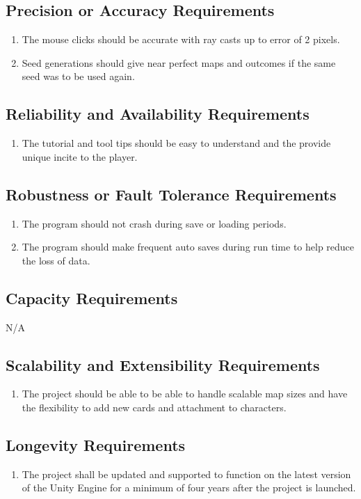 \documentclass{article}
\begin{document}
\subsection{Precision or Accuracy Requirements}
\begin{enumerate}[{PAR}1. ]
	\item The mouse clicks should be accurate with ray casts up to error of 2 pixels.
	\item Seed generations should give near perfect maps and outcomes if the same seed was to be used again.
\end{enumerate}
\subsection{Reliability and Availability Requirements}
\begin{enumerate}[{RAR}1. ]
	\item The tutorial and tool tips should be easy to understand and the provide unique incite to the player.
\end{enumerate}
\subsection{Robustness or Fault Tolerance Requirements}
\begin{enumerate}[{RFR}1. ]
	\item The program should not crash during save or loading periods.
	\item The program should make frequent auto saves during run time to help reduce the loss of data.
\end{enumerate}
\subsection{Capacity Requirements}
\quad N/A
\subsection{Scalability and Extensibility Requirements}
\begin{enumerate}[{SER}1. ]
	\item The project should be able to be able to handle scalable map sizes and have the flexibility to add new cards and attachment to characters.
\end{enumerate}
\subsection{Longevity Requirements}
\begin{enumerate}[{LR}1. ]
	\item The project shall be updated and supported to function on the latest version of the Unity Engine for a minimum of four years after the project is launched.
\end{enumerate}
\end{document}

